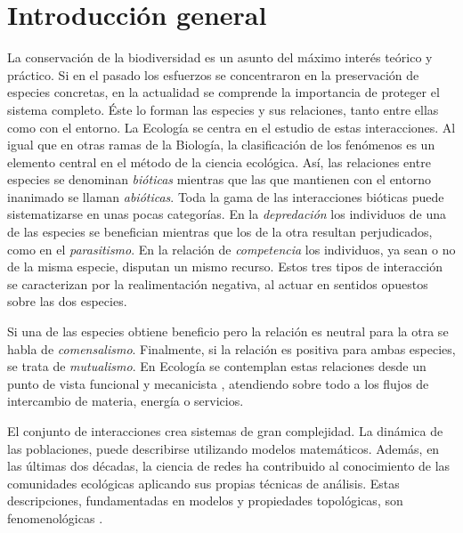 
\chapter{Introducción general} %

\label{INTROGEN} %


La conservación de la biodiversidad es un asunto del máximo interés teórico y práctico. Si en el pasado los esfuerzos se concentraron en la preservación de especies concretas, en la actualidad se comprende la importancia de proteger el sistema completo. Éste lo forman las especies y sus relaciones, tanto entre ellas como con el entorno. La Ecología se centra en el estudio de estas interacciones. Al igual que en otras ramas de la Biología, la clasificación de los fenómenos es un elemento central en el método de la ciencia ecológica. Así, las relaciones entre especies se denominan \textit{bióticas} mientras que las que mantienen con el entorno inanimado se llaman \textit{abióticas}. Toda la gama de las interacciones bióticas puede sistematizarse en unas pocas categorías. En la \textit{depredación} los individuos de una de las especies se benefician mientras que los de la otra resultan perjudicados, como en el \textit{parasitismo}. En la relación de \textit{competencia} los individuos, ya sean o no de la misma especie, disputan un mismo recurso. Estos tres tipos de interacción se caracterizan por la realimentación negativa, al actuar en sentidos opuestos sobre las dos especies. 

Si una de las especies obtiene beneficio pero la relación es neutral para la otra se habla de \textit{comensalismo}. Finalmente, si la relación es positiva para ambas especies, se trata de \textit{mutualismo}. En Ecología se contemplan estas relaciones desde un punto de vista funcional y mecanicista \cite{rockwood2006introduction}, atendiendo sobre todo a los flujos de intercambio de materia, energía o servicios.

El conjunto de interacciones crea sistemas de gran complejidad. La dinámica de las poblaciones, puede describirse utilizando modelos matemáticos. Además, en las últimas dos décadas, la ciencia de redes ha contribuido al conocimiento de las comunidades ecológicas aplicando sus propias técnicas de análisis. Estas descripciones, fundamentadas en modelos y propiedades topológicas, son fenomenológicas \cite{van2010ethical}.

